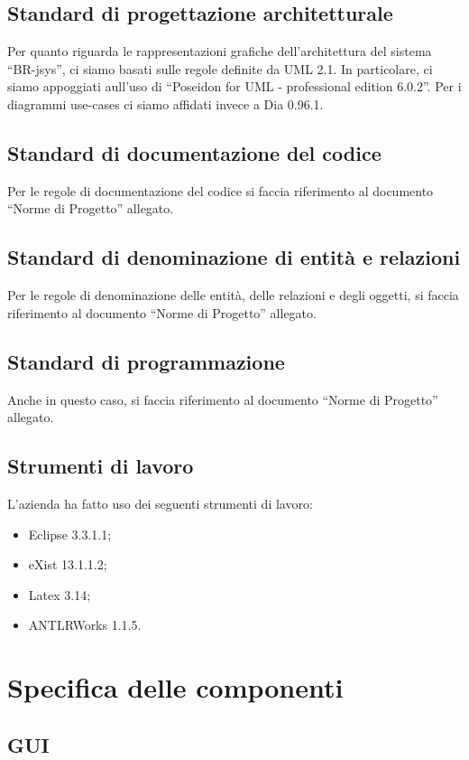 \documentclass[11pt,titlepage,a4paper]{report}
\begin{document}
\section{Standard di progettazione architetturale}
Per quanto riguarda le rappresentazioni grafiche dell'architettura del sistema ``BR-jsys'', ci siamo basati sulle regole definite da UML 2.1. In particolare, ci siamo appoggiati aull'uso di ``Poseidon for UML - professional edition 6.0.2''. Per i diagrammi use-cases ci siamo affidati invece a Dia 0.96.1.
\section{Standard di documentazione del codice}
Per le regole di documentazione del codice si faccia riferimento al documento ``Norme di Progetto'' allegato.
\section{Standard di denominazione di entit\`a e relazioni}
Per le regole di denominazione delle entit\`a, delle relazioni e degli oggetti, si faccia riferimento al documento ``Norme di Progetto'' allegato.
\section{Standard di programmazione}
Anche in questo caso, si faccia riferimento al documento ``Norme di Progetto'' allegato.
\section{Strumenti di lavoro}
L'azienda ha fatto uso dei seguenti strumenti di lavoro:
\begin{itemize}
\item Eclipse 3.3.1.1;
\item eXist 13.1.1.2; 
\item Latex 3.14;
\item ANTLRWorks 1.1.5.
\end{itemize}
\chapter{Specifica delle componenti}
\section{GUI}
\end{document}
